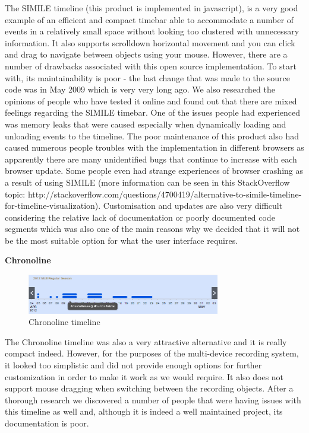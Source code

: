 \documentclass{l3proj}
\begin{document}
The SIMILE timeline (this product is implemented in javascript), is a very good example of an efficient and compact timebar able to accommodate a number of events in a relatively small space without looking too clustered with unnecessary information. It also supports scrolldown horizontal movement and  you can click and drag to navigate between objects using your mouse. However, there are a number of drawbacks associated with this open source implementation. To start with, its maintainability is poor - the last change that was made to the source code was in May 2009 which is very very long ago. We also researched the opinions of people who have tested it online and found out that there are mixed feelings regarding the SIMILE timebar. One of the issues people had experienced was memory leaks that were caused especially when dynamically loading and unloading events to the timeline. The poor maintenance of this product also had caused numerous people troubles with the implementation in different browsers as apparently there are many unidentified bugs that continue to increase with each browser update. Some people even had strange experiences of browser crashing as a result of using SIMILE (more information can be seen in this StackOverflow topic: http://stackoverflow.com/questions/4700419/alternative-to-simile-timeline-for-timeline-visualization). Customisation and updates are also very difficult considering the relative lack of documentation or poorly documented code segments which was also one of the main reasons why we decided that it will not be the most suitable option for what the user interface requires.


\textbf{Chronoline}

\begin{figure}[ht!]
  \centering
\includegraphics[width=0.75\textwidth]{images/Chronoline.png}
\caption{Chronoline timeline}
\end{figure}

The Chronoline timeline was also a very attractive alternative and it is really compact indeed. However, for the purposes of the multi-device recording system, it looked too simplistic and did not provide enough options for further customization in order to make it work as we would require. It also does not support mouse dragging when switching between the recording objects. After a thorough research we discovered a number of people that were having issues with this timeline as well and, although it is indeed a well maintained project, its documentation is poor.
\end{document}
